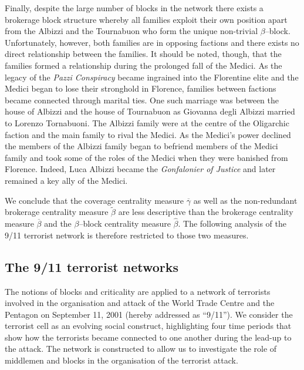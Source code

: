 Finally, despite the large number of blocks in the network there exists a brokerage block structure whereby all families exploit their own position apart from the Albizzi and the Tournabuon who form the unique non-trivial $\beta$--block. Unfortunately, however, both families are in opposing factions and there exists no direct relationship between the families. It should be noted, though, that the families formed a relationship during the prolonged fall of the Medici. As the legacy of the \textit{Pazzi Conspiracy} became ingrained into the Florentine elite and the Medici began to lose their stronghold in Florence, families between factions became connected through marital ties. One such marriage was between the house of Albizzi and the house of Tournabuon as Giovanna degli Albizzi married to Lorenzo Tornabuoni. The Albizzi family were at the centre of the Oligarchic faction and the main family to rival the Medici. As the Medici's power declined the members of the Albizzi family began to befriend members of the Medici family and took some of the roles of the Medici when they were banished from Florence. Indeed, Luca Albizzi became the \textit{Gonfalonier of Justice} and later remained a key ally of the Medici.

We conclude that the coverage centrality measure $\overline{\gamma}$ as well as the non-redundant brokerage centrality measure $\widetilde{\beta}$ are less descriptive than the brokerage centrality measure $\overline{\beta}$ and the $\beta$--block centrality measure $\widehat{\beta}$. The following analysis of the 9/11 terrorist network is therefore restricted to those two measures.

\subsection{The 9/11 terrorist networks}

The notions of blocks and criticality are applied to a network of terrorists involved in the organisation and attack of the World Trade Centre and the Pentagon on September 11, 2001 (hereby addressed as ``9/11''). We consider the terrorist cell as an evolving social construct, highlighting four time periods that show how the terrorists became connected to one another during the lead-up to the attack. The network is constructed to allow us to investigate the role of middlemen and blocks in the organisation of the terrorist attack.


